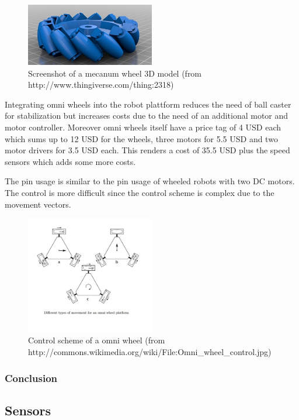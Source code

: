 \documentclass[11pt,a4paper]{article}
\begin{document}
\begin{figure}[h!]
  \centering
  \includegraphics[width=0.5\textwidth]{images/mecanum.png}
  \caption{Screenshot of a mecanum wheel 3D model (from http://www.thingiverse.com/thing:2318)}
\end{figure}

Integrating omni wheels into the robot plattform reduces the need of ball caster for stabilization but increases costs due to the need of an additional motor and motor controller. Moreover omni wheels itself have a price tag of 4 USD each which sums up to 12 USD for the wheels, three motors for 5.5 USD and two motor drivers for 3.5 USD each. This renders a cost of 35.5 USD plus the speed sensors which adds some more costs. 

The pin usage is similar to the pin usage of wheeled robots with two DC motors. The control is more difficult since the control scheme is complex due to the movement vectors. 

\begin{figure}[h!]
  \centering
  \includegraphics[width=0.5\textwidth]{images/omniwheel.jpg}
  \caption{Control scheme of a omni wheel (from http://commons.wikimedia.org/wiki/File:Omni\_wheel\_control.jpg)}
\end{figure}


\subsubsection{Conclusion}


\subsection{Sensors}
\end{document}
